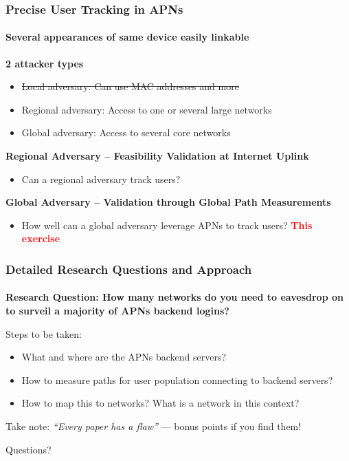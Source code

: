 \begin{frame}
\frametitle{Precise User Tracking in APNs}
\framesubtitle{Several appearances of same device easily linkable}

\textbf{2 attacker types}\\
\begin{itemize}
\item \st{Local adversary: Can use MAC addresses and more}
\item Regional adversary: Access to one or several large networks 
\item Global adversary: Access to several core networks
\end{itemize}

\textbf{Regional Adversary -- Feasibility Validation at Internet Uplink}\\
\begin{itemize}
\item Can a regional adversary track users?  \textbf{\textcolor{TUMGreen}{\checkmark}}
\end{itemize}

\textbf{Global Adversary -- Validation through Global Path Measurements}\\
\begin{itemize}
	\item How well can a global adversary leverage APNs to track users? \textcolor{red}{\textbf{This exercise}}
\end{itemize}

\end{frame}
\clearpage

\begin{frame}
\frametitle{Detailed Research Questions and Approach}
\framesubtitle{}

\textbf{Research Question: How many networks do you need to eavesdrop on to surveil a majority of APNs backend logins?}

Steps to be taken:
\begin{itemize}
	\item What and where are the APNs backend servers?
	\item How to measure paths for user population connecting to backend servers?
	\item How to map this to networks? What is a network in this context?
\end{itemize}

Take note: \textit{``Every paper has a flaw''} --- bonus points if you find them! \smiley{}

Questions?
\end{frame}
\clearpage

